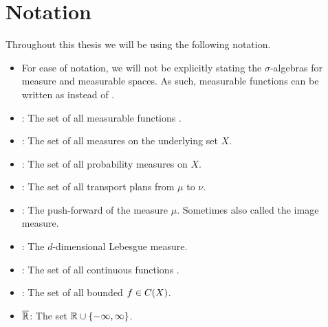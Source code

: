 \chapter*{Notation}

Throughout this thesis we will be using the following notation.

\begin{itemize}
	\item For ease of notation, we will not be explicitly stating the $\sigma$-algebras for measure and measurable spaces. As such, measurable functions can be written as  instead of .
	\item {}: The set of all measurable functions .
	\item {}: The set of all measures on the underlying set $X$.
	\item {}: The set of all probability measures on $X$.
	\item \TP{\mu}{\nu}: The set of all transport plans from $\mu$ to $\nu$.
	\item \push{\mu}: The push-forward of the measure $\mu$. Sometimes also called the image measure.
	\item \leb[d]{\cdot}: The $d$-dimensional Lebesgue measure.
	\item {}: The set of all continuous functions .
	\item {}: The set of all bounded $f \in C_{}(X)$.
	\item $\overline{\mathbb{R}}$: The set $\mathbb{R} \cup \{ -\infty, \infty \}$.
\end{itemize}